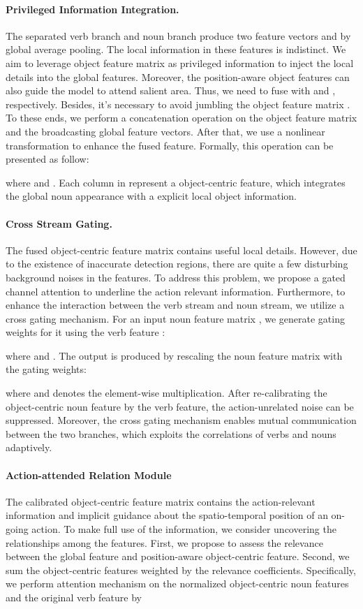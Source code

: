 \documentclass[letterpaper]{article} \usepackage{aaai20}  \usepackage{times}  \usepackage{helvet} \usepackage{courier}  \usepackage[hyphens]{url}  \usepackage{graphicx} \urlstyle{rm} \def\UrlFont{\rm}  \usepackage{graphicx}  \frenchspacing  \setlength{\pdfpagewidth}{8.5in}  \setlength{\pdfpageheight}{11in}  \usepackage{amsfonts,amssymb}
\begin{document}
\paragraph{Privileged Information Integration.}
The separated verb branch and noun branch produce two feature vectors  and  by global average pooling. The local information in these features is indistinct. We aim to leverage object feature matrix  as privileged information to inject the local details into the global features. Moreover, the position-aware object features can also guide the model to attend salient area. Thus, we need to fuse  with  and , respectively.
Besides, it's necessary to avoid jumbling the object feature matrix . To these ends, we perform a concatenation operation on the object feature matrix and the broadcasting global feature vectors. After that, we use a nonlinear transformation to enhance the fused feature. Formally, this operation can be presented as follow:

where  and  . Each column in  represent a object-centric feature, which integrates the global noun appearance with a explicit local object information. 

\paragraph{Cross Stream Gating.}
The fused object-centric feature matrix contains useful local details. However, due to the existence of inaccurate detection regions, there are quite a few disturbing background noises in the features. To address this problem, we propose a gated channel attention to underline the action relevant information. Furthermore, to enhance the interaction between the verb stream and noun stream, we utilize a cross gating mechanism. For an input noun feature matrix 
, we generate gating weights for it using the verb feature :

where  and .
The output is produced by rescaling the noun feature matrix with the gating weights:

where  and  denotes the element-wise multiplication.
After re-calibrating the object-centric noun feature by the verb feature, the action-unrelated noise can be suppressed.
Moreover, the cross gating mechanism enables mutual communication between the two branches, which exploits the correlations of verbs and nouns adaptively.
\paragraph{Action-attended Relation Module}
The calibrated object-centric feature matrix contains the action-relevant information and implicit guidance about the spatio-temporal position of an on-going action. To make full use of the information, we consider uncovering the relationships among the features. First, we propose to assess the relevance between the global feature and position-aware object-centric feature. Second, we sum the object-centric features weighted by the relevance coefficients.
Specifically, we perform attention mechanism on the normalized object-centric noun features  and the original verb feature  by
\end{document}
